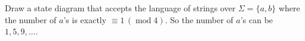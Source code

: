 Draw a state diagram that accepts the language of strings over 
$\Sigma = \{a, b\}$ where the number of $a$'s is exactly 
$\equiv 1 \, (\operatorname{mod} 4)$.
So the number of $a$'s can be $1, 5, 9, \ldots$.
